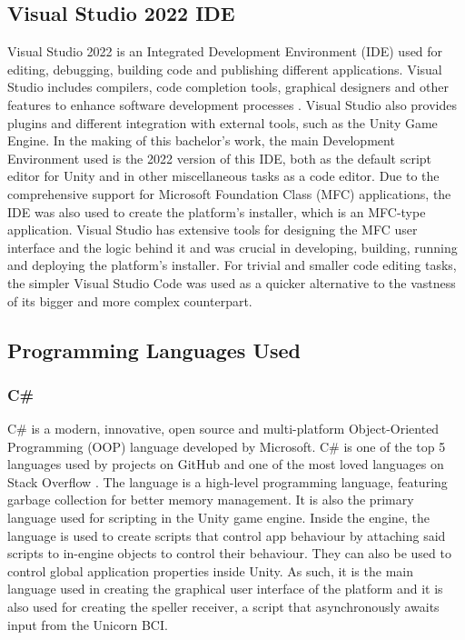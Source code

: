 \subsection{Visual Studio 2022 IDE}
Visual Studio 2022 is an Integrated Development Environment (IDE) used for editing, debugging, building code and publishing different applications. Visual Studio includes compilers, code completion tools, graphical designers and other features to enhance software development processes \cite{VisualStudio}. Visual Studio also provides plugins and different integration with external tools, such as the Unity Game Engine. In the making of this bachelor's work, the main Development Environment used is the 2022 version of this IDE, both as the default script editor for Unity and in other miscellaneous tasks as a code editor.
\vspace{\baselineskip}\newline
Due to the comprehensive support for Microsoft Foundation Class (MFC) applications, the IDE was also used to create the platform's installer, which is an MFC-type application. Visual Studio has extensive tools for designing the MFC user interface and the logic behind it and was crucial in developing, building, running and deploying the platform's installer.
\vspace{\baselineskip}\newline
For trivial and smaller code editing tasks, the simpler Visual Studio Code was used as a quicker alternative to the vastness of its bigger and more complex counterpart.
\vspace{\baselineskip}\newline


\subsection{Programming Languages Used}
\subsubsection{C\#}
C\# is a modern, innovative, open source and multi-platform Object-Oriented Programming (OOP) language \cite{C_sharp} developed by Microsoft. C\# is one of the top 5 languages used by projects on GitHub and one of the most loved languages on Stack Overflow \cite{StackOverflow_language_survey}. The language is a high-level programming language, featuring garbage collection for better memory management. It is also the primary language used for scripting in the Unity game engine. Inside the engine, the language is used to create scripts that control app behaviour by attaching said scripts to in-engine objects to control their behaviour. They can also be used to control global application properties inside Unity. As such, it is the main language used in creating the graphical user interface of the platform and it is also used for creating the speller receiver, a script that asynchronously awaits input from the Unicorn BCI.

